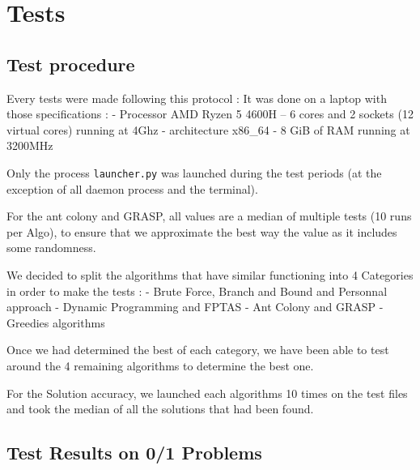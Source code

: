 \documentclass[a4paper, 11pt]{article}
\begin{document}
\section{Tests}
    \subsection{Test procedure}

    Every tests were made following this protocol :
    It was done on a laptop with those specifications :
    \tabto{1.5cm} - Processor AMD Ryzen 5 4600H
    \tabto{2.5cm} -- 6 cores and 2 sockets (12 virtual cores) running at 4Ghz
    \tabto{1.5cm} - architecture x86\_64
    \tabto{1.5cm} - 8 GiB of RAM running at 3200MHz

    Only the process \verb+launcher.py+ was launched during the test periods (at the exception of all daemon process and the terminal).

    For the ant colony and GRASP, all values are a median of multiple tests (10 runs per Algo), to ensure that we approximate the best way the value as it includes some randomness.

    We decided to split the algorithms that have similar functioning into 4 Categories in order to make the tests :
    \tabto{1.5cm} - Brute Force, Branch and Bound and Personnal approach
    \tabto{1.5cm} - Dynamic Programming and FPTAS
    \tabto{1.5cm} - Ant Colony and GRASP
    \tabto{1.5cm} - Greedies algorithms
    
    Once we had determined the best of each category, we have been able to test around the 4 remaining algorithms to determine the best one.

    For the Solution accuracy, we launched each algorithms 10 times on the test files and took the median of all the solutions that had been found.

    \subsection{Test Results on 0/1 Problems}
\end{document}
